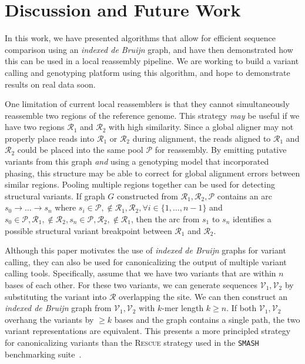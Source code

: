 \documentclass[11pt]{article}
\begin{document}
\section{Discussion and Future Work}
\label{sec:discussion}

In this work, we have presented algorithms that allow for efficient sequence comparison using an \emph{indexed
de Bruijn} graph, and have then demonstrated how this can be used in a local reassembly pipeline. We are
working to build a variant calling and genotyping platform using this algorithm, and hope to demonstrate
results on real data soon.

One limitation of current local reassemblers is that they cannot simultaneously reassemble two regions
of the reference genome. This strategy \emph{may} be useful if we have two regions $\mathcal{R}_1$ and
$\mathcal{R}_2$ with high similarity. Since a global aligner may not properly place reads into
$\mathcal{R}_1$ or $\mathcal{R}_2$ during alignment, the reads aligned to $\mathcal{R}_1$ and
$\mathcal{R}_2$ could be placed into the same pool $\mathcal{P}$ for reassembly. By emitting putative
variants from this graph \emph{and} using a genotyping model that incorporated phasing, this structure
may be able to correct for global alignment errors between similar regions. Pooling multiple regions
together can be used for detecting structural variants. If graph $G$ constructed from $\mathcal{R}_1,
\mathcal{R}_2, \mathcal{P}$ contains an arc $s_0 \rightarrow \dots \rightarrow s_n$ where $s_i \in
\mathcal{P}, \not\in \mathcal{R}_1, \mathcal{R}_2, \forall i \in \{1, \dots, n - 1\}$ and $s_0 \in \mathcal{P},
\mathcal{R}_1, \not\in \mathcal{R}_2, s_n \in \mathcal{P}, \mathcal{R}_2, \not\in \mathcal{R}_1$, then the
arc from $s_1$ to $s_n$ identifies a possible structural variant breakpoint between $\mathcal{R}_1$ and
$\mathcal{R}_2$.

Although this paper motivates the use of \emph{indexed de Bruijn} graphs for variant calling, they can also
be used for canonicalizing the output of multiple variant calling tools. Specifically, assume that we have
two variants that are within $n$ bases of each other. For these two variants, we can generate sequences
$\mathcal{V}_1, \mathcal{V}_2$ by substituting the variant into $\mathcal{R}$ overlapping the site. We
can then construct an \emph{indexed de Bruijn} graph from $\mathcal{V}_1, \mathcal{V}_2$ with $k$-mer length
$k \ge n$. If both $\mathcal{V}_1, \mathcal{V}_2$ overhang the variants by $\ge k$ bases and the graph
contains a single path, the two variant representations are equivalent. This presents a more principled
strategy for canonicalizing variants than the \textsc{Rescue} strategy used in the \texttt{SMASH}
benchmarking suite~\cite{talwalkar14}.
\end{document}
